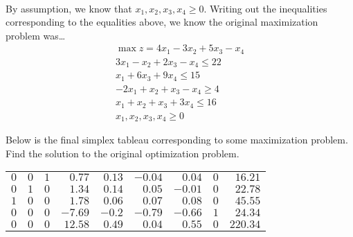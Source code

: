 \documentclass[12pt,letterpaper]{exam}
\begin{document}
\begin{questions}
{\[\begin{gathered}
	\end{gathered}
	\]
By assumption, we know that $x_1, x_2, x_3, x_4 \geq 0$. Writing out the inequalities corresponding to the equalities above, we know the original maximization problem was\dots
	\[
	\begin{gathered}
	\max z= 4x_1 - 3x_2 + 5x_3 - x_4 \\
	3x_1 - x_2 + 2x_3 - x_4 \leq 22 \\
	x_1 + 6x_3 + 9x_4 \leq 15 \\
	-2x_1 + x_2 + x_3 - x_4 \geq 4 \\
	x_1 + x_2 + x_3 + 3x_4 \leq 16 \\
	x_1, x_2, x_3, x_4 \geq 0
	\end{gathered}
	\]
}



\newpage
\question[10] Below is the final simplex tableau corresponding to some maximization problem. Find the solution to the original optimization problem. \par
	\begin{table}[!ht]
	\centering
	\begin{tabular}{rrrrrrrrr}
	$0$ & $0$ & $1$ & $0.77$ & $0.13$ & $-0.04$ & $0.04$ & $0$ & $16.21$ \\
	$0$ & $1$ & $0$ & $1.34$ & $0.14$ & $0.05$ & $-0.01$ & $0$ & $22.78$ \\
	$1$ & $0$ & $0$ & $1.78$ & $0.06$ & $0.07$ & $0.08$ & $0$ & $45.55$ \\
	$0$ & $0$ & $0$ & $-7.69$ & $-0.2$ & $-0.79$ & $-0.66$ & $1$ & $24.34$ \\
	$0$ & $0$ & $0$ & $12.58$ & $0.49$ & $0.04$ & $0.55$ & $0$ & $220.34$ 	
	\end{tabular}
	\end{table} 


\end{questions}
\end{document}
